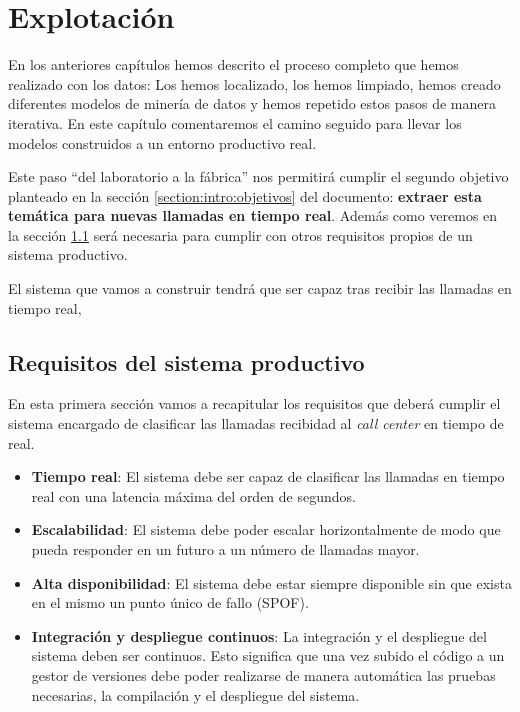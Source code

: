 \chapter{Explotación}
\label{chapter:prod}

En los anteriores capítulos hemos descrito el proceso completo que hemos realizado con los datos: Los hemos localizado, los hemos limpiado, hemos creado diferentes modelos de minería de datos y hemos repetido estos pasos de manera iterativa. En este capítulo comentaremos el camino seguido para llevar los modelos construidos a un entorno productivo real.

Este paso ``del laboratorio a la fábrica'' nos permitirá  cumplir el segundo objetivo planteado en la sección \ref{section:intro:objetivos} del documento: \textbf{extraer esta temática para nuevas llamadas en tiempo real}. Además como veremos en la sección \ref{section:prod:req} será necesaria para cumplir con otros requisitos propios de un sistema productivo.

El sistema que vamos a construir tendrá que ser capaz tras recibir las llamadas en tiempo real, 



\section{Requisitos del sistema productivo}
\label{section:prod:req}

En esta primera sección vamos a recapitular los requisitos que deberá cumplir el sistema encargado de clasificar las llamadas recibidad al \textit{call center} en tiempo de real. 

\begin{itemize}
	\item \textbf{Tiempo real}: El sistema debe ser capaz de clasificar las llamadas en tiempo real con una latencia máxima del orden de segundos. 
	\item \textbf{Escalabilidad}: El sistema debe poder escalar horizontalmente de modo que pueda responder en un futuro a un número de llamadas mayor. 
	\item \textbf{Alta disponibilidad}: El sistema debe estar siempre disponible sin que exista en el mismo un punto único de fallo (SPOF).
	\item \textbf{Integración y despliegue continuos}: La integración y el despliegue del sistema deben ser continuos. Esto significa que una vez subido el código a un gestor de versiones debe poder realizarse de manera automática las pruebas necesarias, la compilación y el despliegue del sistema.
	
\end{itemize}


